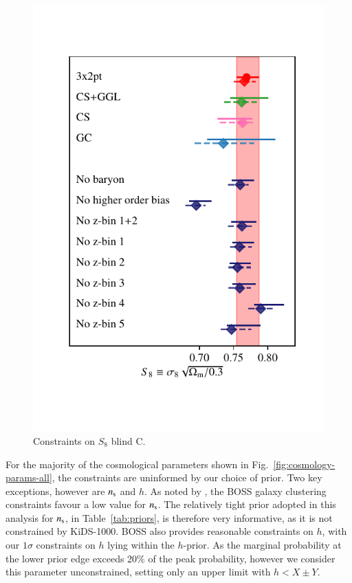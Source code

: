 \begin{figure}
	\begin{center}
		\includegraphics[width=\columnwidth]{Parameter_Plots/systematics/S8_comparison_blindC}
		\caption{Constraints on $S_{8}$ blind C. }
		\label{fig:S8comp}
	\end{center}
\end{figure}

For the majority of the cosmological parameters shown in Fig.~\ref{fig:cosmology-params-all}, the constraints are uninformed by our choice of prior.  Two key exceptions, however are $n_{\rm s}$ and $h$.  As noted by \citet{troester/etal:2020}, the BOSS galaxy clustering constraints favour a low value for $n_{\rm s}$.   The relatively tight prior adopted in this analysis for $n_{\rm s}$, in Table~\ref{tab:priors}, is therefore very informative, as it is not constrained by KiDS-1000.   BOSS also provides reasonable constraints on $h$, with our $1\sigma$ constraints on $h$ lying within the $h$-prior.   As the marginal probability at the lower prior edge exceeds 20\% of the peak probability, however we consider this parameter unconstrained, setting only an upper limit with $h < X \pm Y$.

